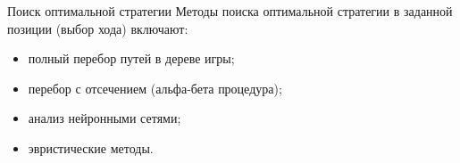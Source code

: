\documentclass{beamer}
\begin{document}
\begin{frame}{Поиск оптимальной стратегии}
Методы поиска оптимальной стратегии в заданной позиции (выбор хода) включают:
\begin{itemize}
\item полный перебор путей в дереве игры;
\item перебор с отсечением (альфа-бета процедура);
\item анализ нейронными сетями;
\item эвристические методы.
\end{itemize}
\end{frame}



%


%

%

  
\end{document}
